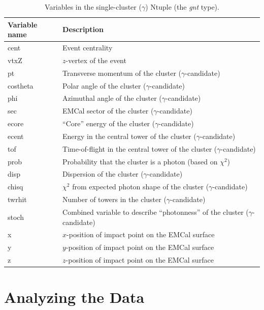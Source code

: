 \documentclass[pdftex,12pt,letter]{article}
\begin{document}
\begin{table}[h]
  \begin{tabular}{|l|l|} \hline
    Variable name & Description \\ \hline
    cent & Event centrality \\
    vtxZ & $z$-vertex of the event \\
    pt   & Transverse momentum of the cluster ($\gamma$-candidate) \\
    costheta & Polar angle of the cluster ($\gamma$-candidate) \\    
    phi & Azimuthal angle of the cluster ($\gamma$-candidate) \\
    sec & EMCal sector of the cluster ($\gamma$-candidate) \\
    ecore & ``Core'' energy of the cluster ($\gamma$-candidate) \\
    ecent & Energy in the central tower of the cluster ($\gamma$-candidate) \\
    tof   & Time-of-flight in the central tower of the cluster ($\gamma$-candidate) \\
    prob & Probability that the cluster is a photon (based on $\chi^2$) \\
    disp & Dispersion of the cluster ($\gamma$-candidate) \\
    chisq & $\chi^2$ from expected photon shape of the cluster ($\gamma$-candidate) \\
    twrhit & Number of towers in the cluster ($\gamma$-candidate) \\
    stoch & Combined variable to describe ``photonness'' of the cluster ($\gamma$-candidate) \\
    x & $x$-position of impact point on the EMCal surface \\
    y & $y$-position of impact point on the EMCal surface \\
    z & $z$-position of impact point on the EMCal surface \\ \hline
  \end{tabular}
  \vspace{0.3cm}
  \caption{Variables in the single-cluster ($\gamma$) Ntuple (the {\it gnt} type).
}
  \label{tab:gnt}
 \end{table}

\section{Analyzing the Data}
\label{code}
\end{document}
